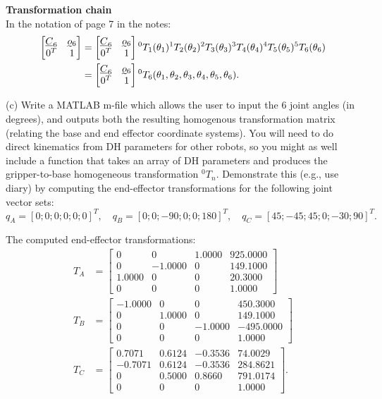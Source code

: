 \documentclass[11pt]{article}
\begin{document}
\vspace{0.6em}
\noindent\textbf{Transformation chain}\\[4pt]
In the notation of page 7 in the notes:
\begin{align*}
    \begin{bmatrix} \underline C_{6} & \undertilde o_6 \\ 0^T & 1 \end{bmatrix} &= \begin{bmatrix} \underline C_{6} & \undertilde o_6 \\ 0^T & 1 \end{bmatrix} {}^{0}T_1 (\theta_1) {}^{1}T_2 (\theta_2) {}^{2}T_3 (\theta_3) {}^{3}T_4 (\theta_4) {}^{4}T_5 (\theta_5) {}^{5}T_6 (\theta_6) \\
                                     &= \begin{bmatrix} \underline C_{6} & \undertilde o_6 \\ 0^T & 1 \end{bmatrix} {}^{0} T_6 (\theta_1, \theta_2, \theta_3, \theta_4, \theta_5, \theta_6)
.\end{align*}

\noindent
(c) Write a MATLAB m-file which allows the user to input the 6 joint angles (in degrees),
and outputs both the resulting homogenous transformation matrix (relating the base and end
effector coordinate systems). You will need to do direct kinematics from DH parameters for
other robots, so you might as well include a function that takes an array of DH parameters
and produces the gripper-to-base homogeneous transformation ${}^{0}\!T_{n}$.
Demonstrate this (e.g., use diary) by computing the end-effector transformations for the
following joint vector sets:
\[
q_A=[0;0;0;0;0;0]^T,\quad
q_B=[0;0;-90;0;0;180]^T,\quad
q_C=[45;-45;45;0;-30;90]^T.
\]

The computed end-effector transformations:
\begin{align*}
    T_A &=
\begin{bmatrix}
    0&  0  &  1.0000 &  925.0000\\
    0& -1.0000 &   0  & 149.1000\\
    1.0000&0&0&20.3000\\
    0&0&0&1.0000
\end{bmatrix}\\
    T_B &=
\begin{bmatrix}
-1.0000&        0 &       0 &450.3000\\
         0 &  1.0000 &       0 &149.1000\\
         0       & 0  &-1.0000&-495.0000\\
         0       & 0       & 0 &  1.0000
\end{bmatrix}\\
    T_C &=
\begin{bmatrix}
 0.7071  & 0.6124 & -0.3536 & 74.0029\\
   -0.7071  & 0.6124 & -0.3536 &284.8621\\
         0  & 0.5000 &  0.8660 &791.0174\\
         0  &      0 &       0 &  1.0000
\end{bmatrix} 
.\end{align*}
\end{document}
